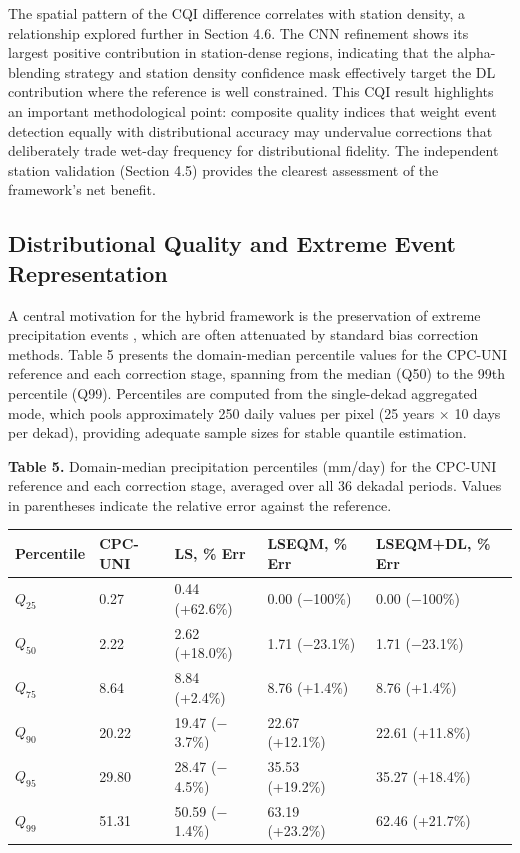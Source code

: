 \documentclass[11pt,a4paper]{article}
\begin{document}
The spatial pattern of the CQI difference correlates with station
density, a relationship explored further in Section 4.6. The CNN
refinement shows its largest positive contribution in station-dense
regions, indicating that the alpha-blending strategy and station density
confidence mask effectively target the DL contribution where the
reference is well constrained. This CQI result highlights an important
methodological point: composite quality indices that weight event
detection equally with distributional accuracy may undervalue
corrections that deliberately trade wet-day frequency for distributional
fidelity. The independent station validation (Section 4.5) provides the
clearest assessment of the framework's net benefit.

\subsection{Distributional Quality and Extreme Event
Representation}

A central motivation for the hybrid framework is the preservation of
extreme precipitation events \cite{ref46}, which are often attenuated by
standard bias correction methods. Table 5 presents the domain-median
percentile values for the CPC-UNI reference and each correction stage,
spanning from the median (Q50) to the 99th percentile (Q99). Percentiles
are computed from the single-dekad aggregated mode, which pools
approximately 250 daily values per pixel (25 years \(\times\) 10 days
per dekad), providing adequate sample sizes for stable quantile
estimation.

\textbf{Table 5.} Domain-median precipitation percentiles (mm/day) for
the CPC-UNI reference and each correction stage, averaged over all 36
dekadal periods. Values in parentheses indicate the relative error
against the reference.

\begingroup\small
\begin{longtable}[]{@{}lllll@{}}
\toprule
Percentile & CPC-UNI & LS, \% Err & LSEQM, \% Err & LSEQM+DL, \% Err \\
\midrule
\endhead
\bottomrule
\endlastfoot
\(Q_{25}\) & 0.27 & 0.44 (+62.6\%) & 0.00 ($-$100\%) & 0.00 ($-$100\%) \\
\(Q_{50}\) & 2.22 & 2.62 (+18.0\%) & 1.71 ($-$23.1\%) & 1.71 ($-$23.1\%) \\
\(Q_{75}\) & 8.64 & 8.84 (+2.4\%) & 8.76 (+1.4\%) & 8.76 (+1.4\%) \\
\(Q_{90}\) & 20.22 & 19.47 ($-$3.7\%) & 22.67 (+12.1\%) & 22.61 (+11.8\%) \\
\(Q_{95}\) & 29.80 & 28.47 ($-$4.5\%) & 35.53 (+19.2\%) & 35.27 (+18.4\%) \\
\(Q_{99}\) & 51.31 & 50.59 ($-$1.4\%) & 63.19 (+23.2\%) & 62.46 (+21.7\%) \\
\end{longtable}
\endgroup
\end{document}
